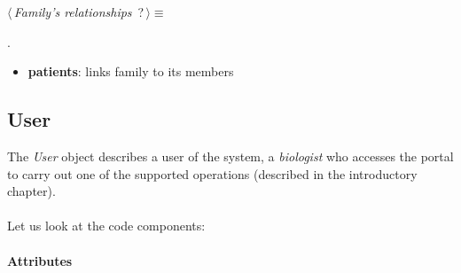 	\begin{flushleft} \small
\begin{minipage}{\linewidth}\label{scrap19}\raggedright\small
{} $\langle\,${\itshape {Family's relationships}}\nobreak\ {\footnotesize {?}}$\,\rangle\equiv$
\vspace{-1ex}
\begin{list}{}{} \item

                
        {\NWsep}
\end{list}
\vspace{-1.5ex}
\footnotesize
\begin{list}{}{\setlength{\itemsep}{-\parsep}\setlength{\itemindent}{-\leftmargin}}
\item {\NWtxtMacroNoRef}.

\item{}
\end{list}
\end{minipage}\vspace{4ex}
\end{flushleft}
\begin{itemize}
 	\item \textbf{patients}: links family to its members
\end{itemize}


\subsection{User}
The \emph{User} object describes a user of the system, a \emph{biologist} who accesses the portal to carry out one of the supported operations (described in the introductory chapter).
\\
\\Let us look at the code components:

\paragraph{Attributes}      

